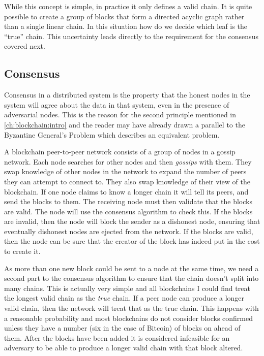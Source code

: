 While this concept is simple, in practice it only defines a valid chain. It is quite possible to create a group of blocks that form a directed acyclic graph rather than a single linear chain. In this situation how do we decide which leaf is the ``true'' chain. This uncertainty leads directly to the requirement for the consensus covered next.

\subsection{Consensus}
\label{ch:blockchain:structure:consensus}

Consensus in a distributed system is the property that the honest nodes in the system will agree about the data in that system, even in the presence of adversarial nodes. This is the reason for the second principle mentioned in \autoref{ch:blockchain:intro} and the reader may have already drawn a parallel to the Byzantine General's Problem \cite{lamportByzantineGeneralsProblem1982} which describes an equivalent problem.

A blockchain peer-to-peer network consists of a group of nodes in a gossip network. Each node searches for other nodes and then \emph{gossips} with them. They swap knowledge of other nodes in the network to expand the number of peers they can attempt to connect to. They also swap knowledge of their view of the blockchain. If one node claims to know a longer chain it will tell its peers, and send the blocks to them. The receiving node must then validate that the blocks are valid. The node will use the consensus algorithm to check this. If the blocks are invalid, then the node will block the sender as a dishonest node, ensuring that eventually dishonest nodes are ejected from the network. If the blocks are valid, then the node can be sure that the creator of the block has indeed put in the cost to create it.

As more than one new block could be sent to a node at the same time, we need a second part to the consensus algorithm to ensure that the chain doesn't split into many chains. This is actually very simple and all blockchains I could find treat the longest valid chain as the \emph{true} chain. If a peer node can produce a longer valid chain, then the network will treat that as the true chain. This happens with a reasonable probability and most blockchains do not consider blocks confirmed unless they have a number (six in the case of Bitcoin) of blocks on ahead of them. After the blocks have been added it is considered infeasible for an adversary to be able to produce a longer valid chain with that block altered.

